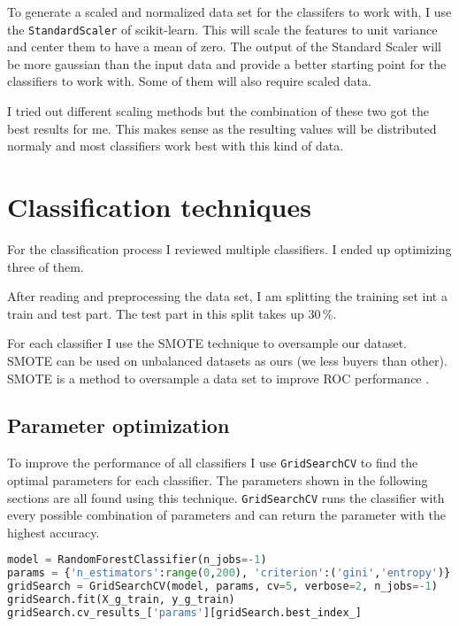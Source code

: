 To generate a scaled and normalized data set for the classifers to work with, I use the \texttt{StandardScaler} of scikit-learn. This will scale the features to unit variance and center them to have a mean of zero. The output of the Standard Scaler will be more gaussian than the input data and provide a better starting point for the classifiers to work with. Some of them will also require scaled data.

I tried out different scaling methods but the combination of these two got the best results for me. This makes sense as the resulting values will be distributed normaly and most classifiers work best with this kind of data.


\section{Classification techniques}

For the classification process I reviewed multiple classifiers. I ended up optimizing three of them.

After reading and preprocessing the data set, I am splitting the training set int a train and test part. The test part in this split takes up 30\,\%.



For each classifier I use the SMOTE technique to oversample our dataset. SMOTE can be used on unbalanced datasets as ours (we less buyers than other). SMOTE is a method to oversample a data set to improve ROC performance \cite{SMOTE}.




\subsection{Parameter optimization}

To improve the performance of all classifiers I use \texttt{GridSearchCV} to find the optimal parameters for each classifier. The parameters shown in the following sections are all found using this technique. \texttt{GridSearchCV} runs the classifier with every possible combination of parameters and can return the parameter with the highest accuracy.

\begin{lstlisting}[language=Python, caption={Example use of \texttt{GridSearchCV} for the random forest classifier}]
model = RandomForestClassifier(n_jobs=-1)
params = {'n_estimators':range(0,200), 'criterion':('gini','entropy')}
gridSearch = GridSearchCV(model, params, cv=5, verbose=2, n_jobs=-1)
gridSearch.fit(X_g_train, y_g_train)
gridSearch.cv_results_['params'][gridSearch.best_index_]
\end{lstlisting}

